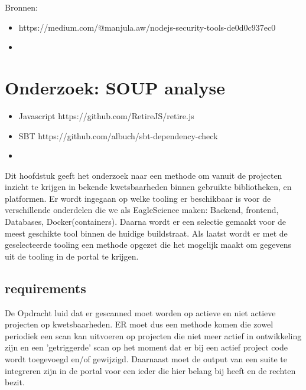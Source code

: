 
Bronnen:

\begin{itemize}
    \item https://medium.com/@manjula.aw/nodejs-security-tools-de0d0c937ec0
    \item
\end{itemize}



\chapter{Onderzoek: SOUP analyse}\label{ch:onderzoek:-soup-analyse} %
\begin{itemize}
    \item Javascript     https://github.com/RetireJS/retire.js
    \item SBT https://github.com/albuch/sbt-dependency-check
    \item
\end{itemize}

Dit hoofdstuk geeft het onderzoek naar een methode om vanuit de projecten inzicht te krijgen in bekende kwetsbaarheden binnen gebruikte bibliotheken, en platformen. Er wordt ingegaan op welke tooling er beschikbaar is voor de verschillende onderdelen die we als EagleScience maken: Backend, frontend, Databases, Docker(containers). Daarna wordt er een selectie gemaakt voor de meest geschikte tool binnen de huidige buildstraat. Als laatst wordt er met de geselecteerde tooling een methode opgezet die het mogelijk maakt om gegevens uit de tooling in de portal te krijgen.

\section{requirements}
De Opdracht luid dat er gescanned moet worden op actieve en niet actieve projecten op kwetsbaarheden. ER moet dus een methode komen die zowel periodiek een scan kan uitvoeren op projecten die niet meer actief in ontwikkeling zijn en een 'getriggerde' scan op het moment dat er bij een actief project code wordt toegevoegd en/of gewijzigd. Daarnaast moet de output van een suite te integreren zijn in de portal voor een ieder die hier belang bij heeft en de rechten bezit.



